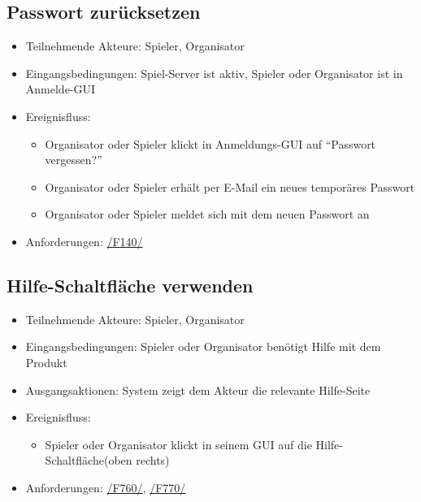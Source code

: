 \documentclass[a4paper]{scrreprt}
\begin{document}
    \subsection{Passwort zurücksetzen}
    \begin{itemize}
        \item Teilnehmende Akteure: \Gls{Spieler}, \Gls{Organisator}
        \item Eingangsbedingungen: \Gls{Spiel-Server} ist aktiv, \Gls{Spieler} oder \Gls{Organisator} ist in Anmelde-GUI
        \item Ereignisfluss:
        \begin{itemize}
            \item \Gls{Organisator} oder \Gls{Spieler} klickt in Anmeldungs-GUI auf \enquote{Passwort vergessen?}
            \item \Gls{Organisator} oder \Gls{Spieler} erhält per E-Mail ein neues temporäres Passwort
            \item \Gls{Organisator} oder \Gls{Spieler} meldet sich mit dem neuen Passwort an
        \end{itemize}
        \item Anforderungen: \hyperlink{F140}{/F140/}
    \end{itemize}

    \subsection{Hilfe-Schaltfläche verwenden}
    \begin{itemize}
        \item Teilnehmende Akteure: \Gls{Spieler}, \Gls{Organisator}
        \item Eingangsbedingungen: \Gls{Spieler} oder \Gls{Organisator} benötigt Hilfe mit dem Produkt
        \item Ausgangsaktionen: System zeigt dem Akteur die relevante Hilfe-Seite
        \item Ereignisfluss:
            \begin{itemize}
                \item \Gls{Spieler} oder \Gls{Organisator} klickt in seinem GUI auf die Hilfe-Schaltfläche(oben rechts)
            \end{itemize}
        \item Anforderungen: \hyperlink{F760}{/F760/}, \hyperlink{F770}{/F770/}
    \end{itemize}

\end{document}
